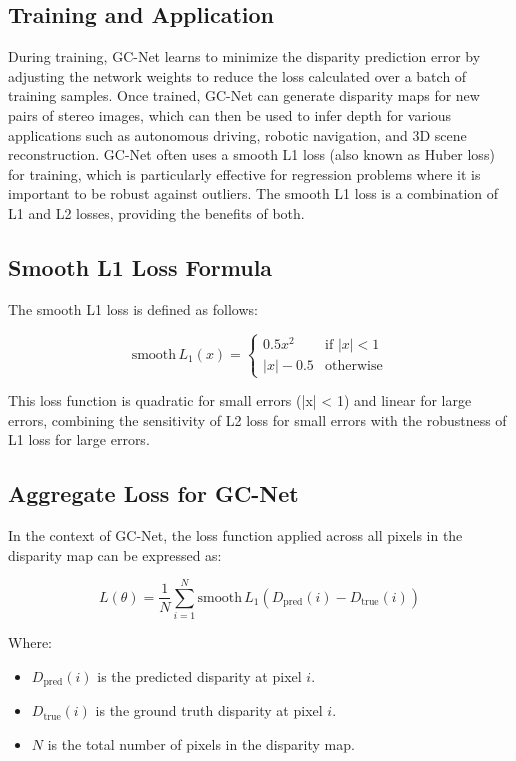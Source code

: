 \documentclass[22pt]{report}
\begin{document}
\subsection{Training and Application}
During training, GC-Net learns to minimize the disparity prediction error by adjusting the network weights to reduce the loss calculated over a batch of training samples. Once trained, GC-Net can generate disparity maps for new pairs of stereo images, which can then be used to infer depth for various applications such as autonomous driving, robotic navigation, and 3D scene reconstruction.
\vspace{30}
GC-Net often uses a smooth L1 loss (also known as Huber loss) for training, which is particularly effective for regression problems where it is important to be robust against outliers. The smooth L1 loss is a combination of L1 and L2 losses, providing the benefits of both.\\
\subsection{Smooth L1 Loss Formula}
The smooth L1 loss is defined as follows:
\begin{center}
                \[
            \text{smooth} \, L_1(x) =
            \begin{cases} 
            0.5 x^2 & \text{if } |x| < 1 \\
            |x| - 0.5 & \text{otherwise}
            \end{cases}
            \]
\end{center}
This loss function is quadratic for small errors (|x| < 1) and linear for large errors, combining the sensitivity of L2 loss for small errors with the robustness of L1 loss for large errors.
\vspace{20}
\subsection{Aggregate Loss for GC-Net}
In the context of GC-Net, the loss function applied across all pixels in the disparity map can be expressed as:
\begin{center}
            \[
        L(\theta) = \frac{1}{N} \sum_{i=1}^{N} \text{smooth} \, L_1 \left( D_{\text{pred}}(i) - D_{\text{true}}(i) \right)
        \]
\end{center}

Where:
\begin{itemize}
    \item \( D_{\text{pred}}(i) \) is the predicted disparity at pixel \( i \). \\
    \item \( D_{\text{true}}(i) \) is the ground truth disparity at pixel \( i \). \\
    \item \( N \) is the total number of pixels in the disparity map.
\end{itemize}
\vspace{15}
\end{document}
